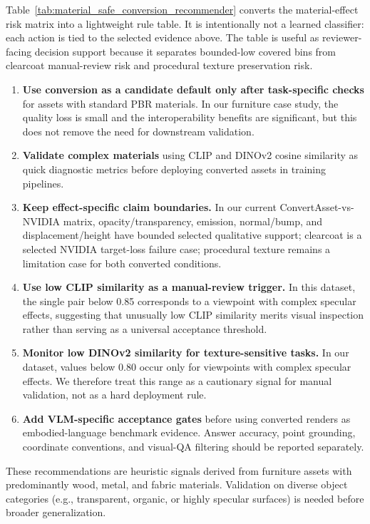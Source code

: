 

Table~\ref{tab:material_safe_conversion_recommender} converts the
material-effect risk matrix into a lightweight rule table. It is intentionally
not a learned classifier: each action is tied to the selected evidence above.
The table is useful as reviewer-facing decision support because it separates
bounded-low covered bins from clearcoat manual-review risk and procedural
texture preservation risk.

\begin{enumerate}
    \item \textbf{Use conversion as a candidate default only after task-specific
    checks} for assets with standard PBR materials. In our furniture case
    study, the quality loss is small and the interoperability benefits are
    significant, but this does not remove the need for downstream validation.
    \item \textbf{Validate complex materials} using CLIP and DINOv2 cosine
    similarity as quick diagnostic metrics before deploying converted assets in
    training pipelines.
    \item \textbf{Keep effect-specific claim boundaries.} In our current
    ConvertAsset-vs-NVIDIA matrix, opacity/transparency, emission, normal/bump,
    and displacement/height have bounded selected qualitative support; clearcoat
    is a selected NVIDIA target-loss failure case; procedural texture remains a
    limitation case for both converted conditions.
    \item \textbf{Use low CLIP similarity as a manual-review trigger.} In this
    dataset, the single pair below 0.85 corresponds to a viewpoint with complex
    specular effects, suggesting that unusually low CLIP similarity merits
    visual inspection rather than serving as a universal acceptance threshold.
    \item \textbf{Monitor low DINOv2 similarity for texture-sensitive tasks.}
    In our dataset, values below 0.80 occur only for viewpoints with complex
    specular effects. We therefore treat this range as a cautionary signal for
    manual validation, not as a hard deployment rule.
    \item \textbf{Add VLM-specific acceptance gates} before using converted
    renders as embodied-language benchmark evidence. Answer accuracy, point
    grounding, coordinate conventions, and visual-QA filtering should be
    reported separately.
\end{enumerate}
These recommendations are heuristic signals derived from furniture assets with
predominantly wood, metal, and fabric materials. Validation on diverse object
categories (e.g., transparent, organic, or highly specular surfaces) is needed
before broader generalization.
